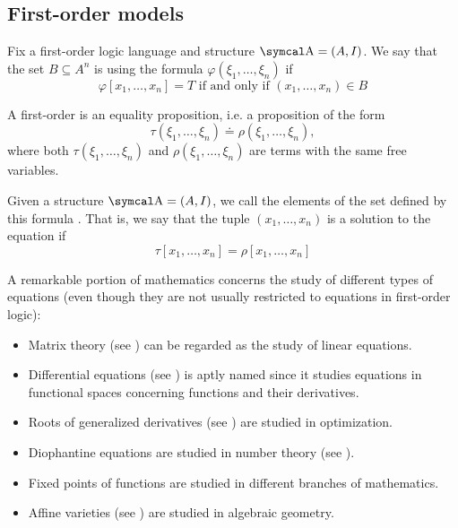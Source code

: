 \subsection{First-order models}\label{subsec:first_order_logic}

\begin{definition}\label{def:first_order_definability}
  Fix a first-order logic language and structure \( \CA = (A, I) \). We say that the set \( B \subseteq A^n \) is  using the formula \( \varphi(\xi_1, \ldots, \xi_n) \) if
  \begin{equation*}
    \varphi[x_1, \ldots, x_n] = T \text{ if and only if } (x_1, \ldots, x_n) \in B
  \end{equation*}
\end{definition}

\begin{definition}\label{def:first_order_equation}
  A first-order  is an equality proposition, i.e. a proposition of the form
  \begin{equation*}
    \tau(\xi_1, \ldots, \xi_n) \doteq \rho(\xi_1, \ldots, \xi_n),
  \end{equation*}
  where both \( \tau(\xi_1, \ldots, \xi_n) \) and \( \rho(\xi_1, \ldots, \xi_n) \) are terms with the same free variables.

  Given a structure \( \CA = (A, I) \), we call the elements of the set defined by this formula . That is, we say that the tuple \( (x_1, \ldots, x_n) \) is a solution to the equation if
  \begin{equation*}
    \tau[x_1, \ldots, x_n] = \rho[x_1, \ldots, x_n]
  \end{equation*}
\end{definition}

\begin{remark}\label{rem:equations}
  A remarkable portion of mathematics concerns the study of different types of equations (even though they are not usually restricted to equations in first-order logic):

  \begin{itemize}
    \item Matrix theory (see ) can be regarded as the study of linear equations.
    \item Differential equations (see ) is aptly named since it studies equations in functional spaces concerning functions and their derivatives.
    \item Roots of generalized derivatives (see ) are studied in optimization.
    \item Diophantine equations are studied in number theory (see ).
    \item Fixed points of functions are studied in different branches of mathematics.
    \item Affine varieties (see ) are studied in algebraic geometry.
  \end{itemize}
\end{remark}

